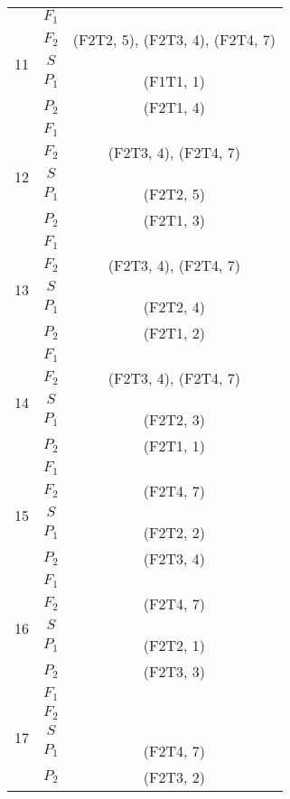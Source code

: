 \documentclass[a4paper,14pt]{extarticle}
\begin{document}
\begin{enumerate}
\begin{longtable}{|c|c|c|}
\multirow{5}{*}{11}&$F_1$&\\
\cline{2-3}
&$F_2$&(F2T2, 5), (F2T3, 4), (F2T4, 7)\\
\cline{2-3}
& $S$ &\\
\cline{2-3}
&$P_1$&(F1T1, 1)\\
\cline{2-3}
&$P_2$&(F2T1, 4)\\
\hline


\multirow{5}{*}{12}&$F_1$&\\
\cline{2-3}
&$F_2$&(F2T3, 4), (F2T4, 7)\\
\cline{2-3}
& $S$ &\\
\cline{2-3}
&$P_1$&(F2T2, 5)\\
\cline{2-3}
&$P_2$&(F2T1, 3)\\
\hline


\multirow{5}{*}{13}&$F_1$&\\
\cline{2-3}
&$F_2$&(F2T3, 4), (F2T4, 7)\\
\cline{2-3}
& $S$ &\\
\cline{2-3}
&$P_1$&(F2T2, 4)\\
\cline{2-3}
&$P_2$&(F2T1, 2)\\
\hline


\multirow{5}{*}{14}&$F_1$&\\
\cline{2-3}
&$F_2$&(F2T3, 4), (F2T4, 7)\\
\cline{2-3}
& $S$ &\\
\cline{2-3}
&$P_1$&(F2T2, 3)\\
\cline{2-3}
&$P_2$&(F2T1, 1)\\
\hline


\multirow{5}{*}{15}&$F_1$&\\
\cline{2-3}
&$F_2$&(F2T4, 7)\\
\cline{2-3}
& $S$ &\\
\cline{2-3}
&$P_1$&(F2T2, 2)\\
\cline{2-3}
&$P_2$&(F2T3, 4)\\
\hline


\multirow{5}{*}{16}&$F_1$&\\
\cline{2-3}
&$F_2$&(F2T4, 7)\\
\cline{2-3}
& $S$ &\\
\cline{2-3}
&$P_1$&(F2T2, 1)\\
\cline{2-3}
&$P_2$&(F2T3, 3)\\
\hline


\multirow{5}{*}{17}&$F_1$&\\
\cline{2-3}
&$F_2$&\\
\cline{2-3}
& $S$ &\\
\cline{2-3}
&$P_1$&(F2T4, 7)\\
\cline{2-3}
&$P_2$&(F2T3, 2)\\
\hline



\end{longtable}
\end{enumerate}
\end{document}
